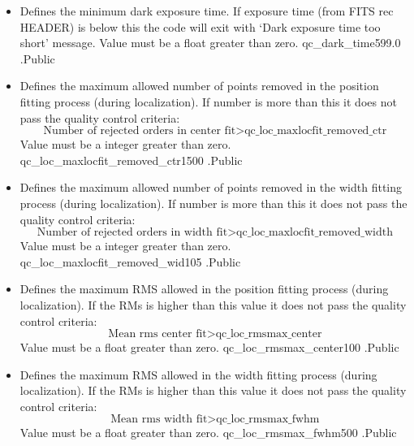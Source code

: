 \begin{itemize}
\item {}
{Defines the minimum dark exposure time. If exposure time (from FITS rec HEADER) is below this the code will exit with `Dark exposure time too short' message. Value must be a float greater than zero.}
{qc\_dark\_time}{599.0}
{\calDARK}{\constantsfile}{\calDARK.\progMAIN}{Public}


\item {}
{Defines the maximum allowed number of points removed in the position fitting process (during localization). If number is more than this it does not pass the quality control criteria: 
\begin{equation}
\text{Number of rejected orders in center fit} >\text{qc\_loc\_maxlocfit\_removed\_ctr}
\end{equation}
Value must be a integer greater than zero.
}
{qc\_loc\_maxlocfit\_removed\_ctr}{1500}
{\callocRAW}{\constantsfile}{\callocRAW.\progMAIN}{Public}


\item {}
{Defines the maximum allowed number of points removed in the width fitting process (during localization). If number is more than this it does not pass the quality control criteria: 
\begin{equation}
\text{Number of rejected orders in width fit} >\text{qc\_loc\_maxlocfit\_removed\_width}
\end{equation}
Value must be a integer greater than zero.
}
{qc\_loc\_maxlocfit\_removed\_wid}{105}
{\callocRAW}{\constantsfile}{\callocRAW.\progMAIN}{Public}


\item {}
{Defines the maximum RMS allowed in the position fitting process (during localization). If the RMs is higher than this value it does not pass the quality control criteria: 
\begin{equation}
\text{Mean rms center fit} > \text{qc\_loc\_rmsmax\_center}
\end{equation}
Value must be a float greater than zero.
}
{qc\_loc\_rmsmax\_center}{100}
{\callocRAW}{\constantsfile}{\callocRAW.\progMAIN}{Public}


\item {}
{Defines the maximum RMS allowed in the width fitting process (during localization). If the RMs is higher than this value it does not pass the quality control criteria: 
\begin{equation}
\text{Mean rms width fit} > \text{qc\_loc\_rmsmax\_fwhm}
\end{equation}
Value must be a float greater than zero.
}
{qc\_loc\_rmsmax\_fwhm}{500}
{\callocRAW}{\constantsfile}{\callocRAW.\progMAIN}{Public}


\end{itemize}
